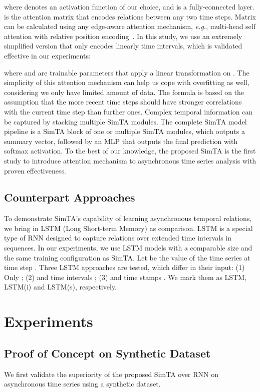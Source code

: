 \documentclass[runningheads]{llncs}
\newcommand{\eg}{\textit{e.g.}}
\begin{document}
where  denotes an activation function of our choice, and  is a fully-connected layer.  is the attention matrix that encodes relations between any two time steps. Matrix  can be calculated using any edge-aware attention mechanism, \eg, multi-head self attention \cite{Vaswani2017AttentionIA} with relative position encoding~\cite{Shaw2018SelfAttentionWR}. In this study, we use an extremely simplified version that only encodes linearly time intervals, which is validated effective in our experiments:
	
	where  and  are trainable parameters that apply a linear transformation on . The simplicity of this attention mechanism can help us cope with overfitting as well, considering we only have limited amount of data. The formula is based on the assumption that the more recent time steps should have stronger correlations with the current time step than further ones. Complex temporal information can be captured by stacking multiple SimTA modules. The complete SimTA model pipeline is a SimTA block of one or multiple SimTA modules, which outputs a summary vector, followed by an MLP that outputs the final prediction with softmax activation. To the best of our knowledge, the proposed SimTA is the first study to introduce attention mechanism to asynchronous time series analysis with proven effectiveness.

\subsection{Counterpart Approaches}
	To demonstrate SimTA's capability of learning asynchronous temporal relations, we bring in LSTM (Long Short-term Memory) \cite{Hochreiter1997LongSM,Greff2017LSTMAS} as comparison. LSTM is a special type of RNN designed to capture relations over extended time intervals in sequences. In our experiments, we use LSTM models with a comparable size and the same training configuration as SimTA. Let  be the value of the time series at time step . Three LSTM approaches are tested, which differ in their input: (1) Only ; (2)  and time intervals ; (3)  and time stamps . We mark them as LSTM, LSTM(i) and LSTM(s), respectively.

\section{Experiments}

\subsection{Proof of Concept on Synthetic Dataset}
	We first validate the superiority of the proposed SimTA over RNN on asynchronous time series using a synthetic dataset.
\end{document}
